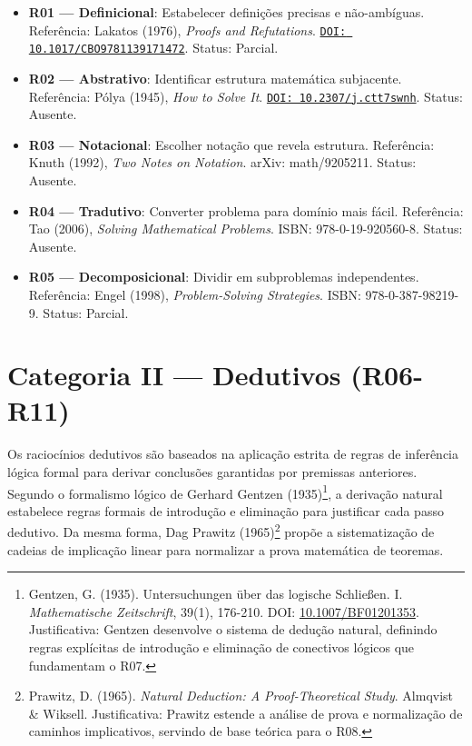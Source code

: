\documentclass[12pt,a4paper,oneside]{abntex2}
\newcommand{\doi}[1]{\href{https://doi.org/#1}{\texttt{DOI: #1}}}
\begin{document}
\begin{apendicesenv}
\begin{itemize}
    \item \textbf{R01 — Definicional}: Estabelecer definições precisas e não-ambíguas. Referência: Lakatos (1976), \textit{Proofs and Refutations}. \doi{10.1017/CBO9781139171472}. Status: Parcial.
    \item \textbf{R02 — Abstrativo}: Identificar estrutura matemática subjacente. Referência: Pólya (1945), \textit{How to Solve It}. \doi{10.2307/j.ctt7swnh}. Status: Ausente.
    \item \textbf{R03 — Notacional}: Escolher notação que revela estrutura. Referência: Knuth (1992), \textit{Two Notes on Notation}. arXiv: math/9205211. Status: Ausente.
    \item \textbf{R04 — Tradutivo}: Converter problema para domínio mais fácil. Referência: Tao (2006), \textit{Solving Mathematical Problems}. ISBN: 978-0-19-920560-8. Status: Ausente.
    \item \textbf{R05 — Decomposicional}: Dividir em subproblemas independentes. Referência: Engel (1998), \textit{Problem-Solving Strategies}. ISBN: 978-0-387-98219-9. Status: Parcial.
\end{itemize}

\section{Categoria II — Dedutivos (R06-R11)}

Os raciocínios dedutivos são baseados na aplicação estrita de regras de inferência lógica formal para derivar conclusões garantidas por premissas anteriores. Segundo o formalismo lógico de Gerhard Gentzen (1935)\footnote{Gentzen, G. (1935). Untersuchungen über das logische Schließen. I. \textit{Mathematische Zeitschrift}, 39(1), 176-210. DOI: \href{https://doi.org/10.1007/BF01201353}{10.1007/BF01201353}. Justificativa: Gentzen desenvolve o sistema de dedução natural, definindo regras explícitas de introdução e eliminação de conectivos lógicos que fundamentam o R07.}, a derivação natural estabelece regras formais de introdução e eliminação para justificar cada passo dedutivo. Da mesma forma, Dag Prawitz (1965)\footnote{Prawitz, D. (1965). \textit{Natural Deduction: A Proof-Theoretical Study}. Almqvist \& Wiksell. Justificativa: Prawitz estende a análise de prova e normalização de caminhos implicativos, servindo de base teórica para o R08.} propõe a sistematização de cadeias de implicação linear para normalizar a prova matemática de teoremas.


\end{apendicesenv}
\end{document}
